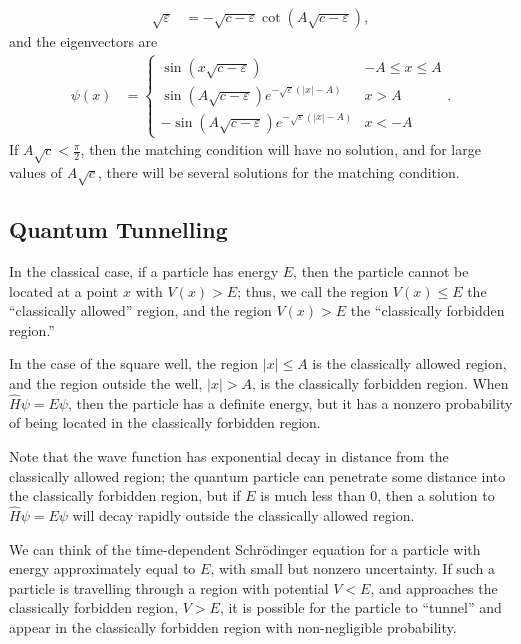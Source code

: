 \documentclass[12pt]{extarticle}
\newcommand{\ve}{\varepsilon}
\theoremstyle{plain}
\theoremstyle{definition}
\theoremstyle{remark}
\renewcommand{\newline}{\hfill\break}
\begin{document}
  \begin{align*}
    \sqrt{\ve} &= -\sqrt{c-\ve}\cot\left(A\sqrt{c-\ve}\right),
  \end{align*}
  and the eigenvectors are
  \begin{align*}
    \psi(x) &= \begin{cases}
      \sin\left(x\sqrt{c-\ve}\right) & -A \leq x \leq A\\
      \sin\left(A\sqrt{c-\ve}\right)e^{-\sqrt{\ve}\left(|x|-A\right)} & x > A\\
      -\sin\left(A\sqrt{c-\ve}\right)e^{-\sqrt{\ve}\left(|x|-A\right)} & x < -A
    \end{cases}.
  \end{align*}
  If $A\sqrt{c} < \frac{\pi}{2}$, then the matching condition will have no solution, and for large values of $A\sqrt{c}$, there will be several solutions for the matching condition.
  \subsection{Quantum Tunnelling}%
  In the classical case, if a particle has energy $E$, then the particle cannot be located at a point $x$ with $V(x) > E$; thus, we call the region $V(x) \leq E$ the ``classically allowed'' region, and the region $V(x) > E$ the ``classically forbidden region.''\newline

  In the case of the square well, the region $|x| \leq A$ is the classically allowed region, and the region outside the well, $|x| > A$, is the classically forbidden region. When $\hat{H}\psi = E\psi$, then the particle has a definite energy, but it has a nonzero probability of being located in the classically forbidden region. \newline

  Note that the wave function has exponential decay in distance from the classically allowed region; the quantum particle can penetrate some distance into the classically forbidden region, but if $E$ is much less than $0$, then a solution to $\hat{H}\psi = E\psi$ will decay rapidly outside the classically allowed region.\newline

  We can think of the time-dependent Schrödinger equation for a particle with energy approximately equal to $E$, with small but nonzero uncertainty. If such a particle is travelling through a region with potential $V < E$, and approaches the classically forbidden region, $V > E$, it is possible for the particle to ``tunnel'' and appear in the classically forbidden region with non-negligible probability.
\end{document}
